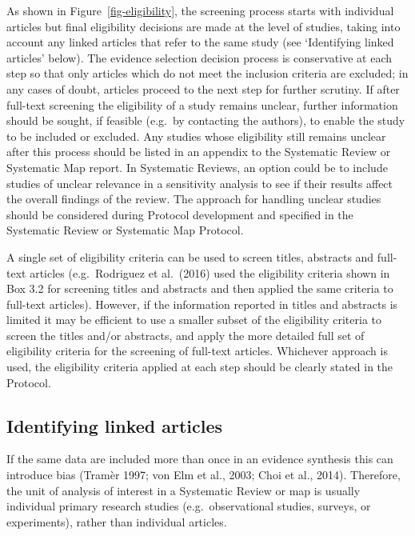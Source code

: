 \documentclass[
  letterpaper,
  DIV=11,
  numbers=noendperiod]{scrreprt}
\begin{document}
As shown in Figure~\ref{fig-eligibility}, the screening process starts
with individual articles but final eligibility decisions are made at the
level of studies, taking into account any linked articles that refer to
the same study (see `Identifying linked articles' below). The evidence
selection decision process is conservative at each step so that only
articles which do not meet the inclusion criteria are excluded; in any
cases of doubt, articles proceed to the next step for further scrutiny.
If after full-text screening the eligibility of a study remains unclear,
further information should be sought, if feasible (e.g.~by contacting
the authors), to enable the study to be included or excluded. Any
studies whose eligibility still remains unclear after this process
should be listed in an appendix to the Systematic Review or Systematic
Map report. In Systematic Reviews, an option could be to include studies
of unclear relevance in a sensitivity analysis to see if their results
affect the overall findings of the review. The approach for handling
unclear studies should be considered during Protocol development and
specified in the Systematic Review or Systematic Map Protocol.

A single set of eligibility criteria can be used to screen titles,
abstracts and full-text articles (e.g.~Rodriguez et al.~(2016) used the
eligibility criteria shown in Box 3.2 for screening titles and abstracts
and then applied the same criteria to full-text articles). However, if
the information reported in titles and abstracts is limited it may be
efficient to use a smaller subset of the eligibility criteria to screen
the titles and/or abstracts, and apply the more detailed full set of
eligibility criteria for the screening of full-text articles. Whichever
approach is used, the eligibility criteria applied at each step should
be clearly stated in the Protocol.

\subsection{Identifying linked
articles}\label{identifying-linked-articles-1}

If the same data are included more than once in an evidence synthesis
this can introduce bias (Tramèr 1997; von Elm et al., 2003; Choi et al.,
2014). Therefore, the unit of analysis of interest in a Systematic
Review or map is usually individual primary research studies
(e.g.~observational studies, surveys, or experiments), rather than
individual articles.
\end{document}
